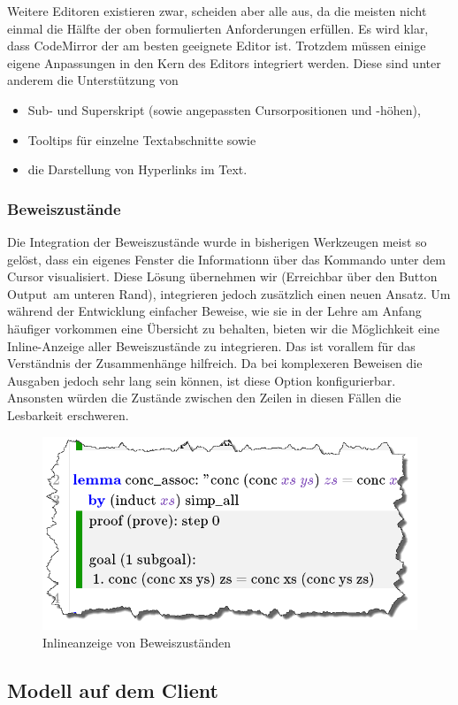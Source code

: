 Weitere Editoren existieren zwar, scheiden aber alle aus, da die meisten nicht einmal die Hälfte der
oben formulierten Anforderungen erfüllen. Es wird klar, dass CodeMirror der am besten geeignete
Editor ist. Trotzdem müssen einige eigene Anpassungen in den Kern des Editors integriert werden.
Diese sind unter anderem die Unterstützung von

\begin{itemize}
  \item Sub- und Superskript (sowie angepassten Cursorpositionen und -höhen),
  \item Tooltips für einzelne Textabschnitte sowie
  \item die Darstellung von Hyperlinks im Text.
\end{itemize}

\subsubsection{Beweiszustände}

Die Integration der Beweiszustände wurde in bisherigen Werkzeugen meist so gelöst, dass ein eigenes
Fenster die Informationn über das Kommando unter dem Cursor visualisiert. Diese Lösung übernehmen
wir (Erreichbar über den Button \glqq Output\grqq\ am unteren Rand), integrieren jedoch zusätzlich
einen neuen Ansatz. Um während der Entwicklung einfacher Beweise, wie sie in der Lehre am Anfang
häufiger vorkommen eine Übersicht zu behalten, bieten wir die Möglichkeit eine Inline-Anzeige aller
Beweiszustände zu integrieren. Das ist vorallem für das Verständnis der Zusammenhänge hilfreich. Da
bei komplexeren Beweisen die Ausgaben jedoch sehr lang sein können, ist diese Option konfigurierbar.
Ansonsten würden die Zustände zwischen den Zeilen in diesen Fällen die Lesbarkeit erschweren.

\begin{figure}[ht]
\centering
\includegraphics[width=0.5\linewidth]{images/inline-states}
  \caption{Inlineanzeige von Beweiszuständen}
  \label{fig:inline-states}
\end{figure}

\subsection{Modell auf dem Client}

